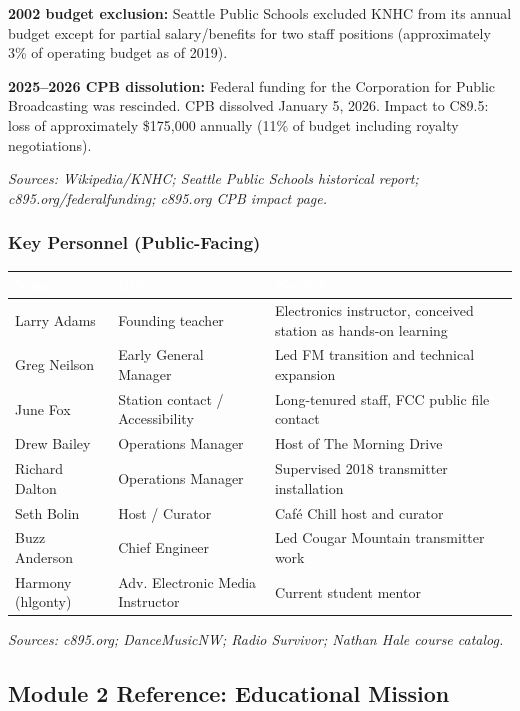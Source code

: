 \documentclass[11pt,letterpaper]{article}
\newcommand{\tableheader}[1]{\textbf{\sffamily\textcolor{white}{#1}}}
\begin{document}
\textbf{2002 budget exclusion:} Seattle Public Schools excluded KNHC from its annual budget except for partial salary/benefits for two staff positions (approximately 3\% of operating budget as of 2019).

\textbf{2025--2026 CPB dissolution:} Federal funding for the Corporation for Public Broadcasting was rescinded. CPB dissolved January 5, 2026. Impact to C89.5: loss of approximately \$175,000 annually (11\% of budget including royalty negotiations).

\textit{Sources: Wikipedia/KNHC; Seattle Public Schools historical report; c895.org/federalfunding; c895.org CPB impact page.}

\subsubsection{Key Personnel (Public-Facing)}

\begin{center}
\begin{tabularx}{\textwidth}{L{3.5cm}L{3.5cm}X}
\toprule
{}
\tableheader{Name} & \tableheader{Role} & \tableheader{Notable} \\
\midrule
Larry Adams & Founding teacher & Electronics instructor, conceived station as hands-on learning \\
Greg Neilson & Early General Manager & Led FM transition and technical expansion \\
June Fox & Station contact / Accessibility & Long-tenured staff, FCC public file contact \\
Drew Bailey & Operations Manager & Host of The Morning Drive \\
Richard Dalton & Operations Manager & Supervised 2018 transmitter installation \\
Seth Bolin & Host / Curator & Café Chill host and curator \\
Buzz Anderson & Chief Engineer & Led Cougar Mountain transmitter work \\
Harmony (hlgonty) & Adv. Electronic Media Instructor & Current student mentor \\
\bottomrule
\end{tabularx}
\end{center}

\textit{Sources: c895.org; DanceMusicNW; Radio Survivor; Nathan Hale course catalog.}

\subsection{Module 2 Reference: Educational Mission}
\end{document}
